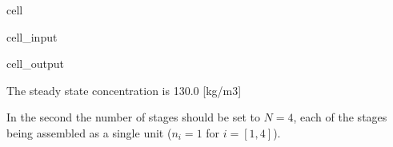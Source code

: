 \documentclass[letterpaper,10pt,english]{jupyterBook}
\begin{document}
\begin{sphinxuseclass}{cell}
\begin{sphinxVerbatimInput}
\begin{sphinxuseclass}{cell_input}
\begin{sphinxVerbatim}[commandchars=\\\{\}]
   
\end{sphinxVerbatim}

\end{sphinxuseclass}\end{sphinxVerbatimInput}
\begin{sphinxVerbatimOutput}

\begin{sphinxuseclass}{cell_output}
\begin{sphinxVerbatim}[commandchars=\\\{\}]
The steady state concentration is 130.0 [kg/m\PYGZca{}3]
\end{sphinxVerbatim}

\end{sphinxuseclass}\end{sphinxVerbatimOutput}

\end{sphinxuseclass}
\sphinxAtStartPar
In the second the number of stages should be set to \(N=4\), each of the stages being assembled as a single unit (\(n_i=1\) for \(i=[1, 4]\)).
\end{document}
